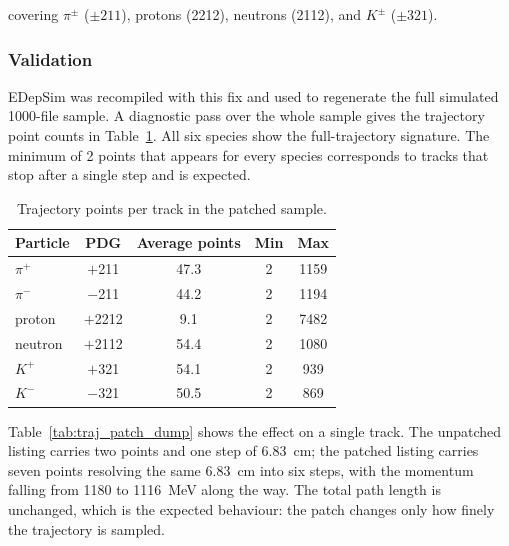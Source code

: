 \documentclass[%
article,
nofootinbib
]{revtex4-2}
\begin{document}
\noindent
covering $\pi^{\pm}$ ($\pm211$), protons (2212), neutrons (2112), and
$K^{\pm}$ ($\pm321$).


\subsubsection{Validation}

EDepSim was recompiled with this fix and used to regenerate the full
simulated 1000-file sample. A
diagnostic pass over the whole sample gives the trajectory point counts in
Table~\ref{tab:traj_points}. All six species show the full-trajectory signature.
The minimum of 2 points that appears for every species corresponds to tracks
that stop after a single step and is expected.

\begin{table}[H]
\centering
\caption{Trajectory points per track in the patched sample.}
\setlength{\tabcolsep}{14pt}
\label{tab:traj_points}
\begin{tabular}{lcccc}
\hline\hline
Particle & PDG & Average points & Min & Max \\
\hline
$\pi^{+}$  & $+$211  & 47.3 & 2 & 1159 \\
$\pi^{-}$  & $-$211  & 44.2 & 2 & 1194 \\
proton     & $+$2212 & 9.1  & 2 & 7482 \\
neutron    & $+$2112 & 54.4 & 2 & 1080 \\
$K^{+}$    & $+$321  & 54.1 & 2 &  939 \\
$K^{-}$    & $-$321  & 50.5 & 2 &  869 \\
\hline\hline
\end{tabular}
\end{table}

Table~\ref{tab:traj_patch_dump} shows the effect on a single track. The
unpatched listing carries two points and one step of 6.83~cm; the patched
listing carries seven points resolving the same 6.83~cm into six steps, with the
momentum falling from 1180 to 1116~MeV along the way. The total path length is
unchanged, which is the expected behaviour: the patch changes only how finely
the trajectory is sampled.
\end{document}
